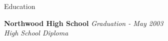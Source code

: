 \documentclass{cv} %
\begin{document}

\begin{rSection}{Education}

{\bf Northwood High School} \hfill {\em Graduation - May 2003} \\ 
{\em High School Diploma} \\
\end{rSection}

\end{document}
